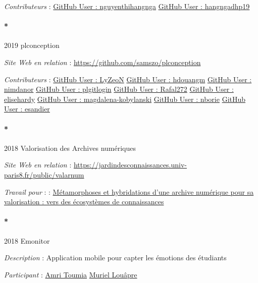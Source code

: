 \documentclass[
  a4paper,
  DIV=11,
  numbers=noendperiod]{scrreprt}
\let\oldparagraph\paragraph
\renewcommand{\paragraph}[1]{\oldparagraph{#1}\mbox{}}
\begin{document}
\emph{Contributeurs} :
\href{http://localhost/samszo/omk/s/fiches/item/301177}{GitHub User :
nguyenthihangnga}
\href{http://localhost/samszo/omk/s/fiches/item/301179}{GitHub User :
hangngadhp19}

\paragraph*{2019 plconception}\label{plconception}

\emph{Site Web en relation} :
\url{https://github.com/samszo/plconception}

\emph{Contributeurs} :
\href{http://localhost/samszo/omk/s/fiches/item/301465}{GitHub User :
LyZeoN} \href{http://localhost/samszo/omk/s/fiches/item/301467}{GitHub
User : hdouangm}
\href{http://localhost/samszo/omk/s/fiches/item/301469}{GitHub User :
nimdanor} \href{http://localhost/samszo/omk/s/fiches/item/301471}{GitHub
User : plgitlogin}
\href{http://localhost/samszo/omk/s/fiches/item/301473}{GitHub User :
Rafal272} \href{http://localhost/samszo/omk/s/fiches/item/301475}{GitHub
User : elisehardy}
\href{http://localhost/samszo/omk/s/fiches/item/301477}{GitHub User :
magdalena-kobylanski}
\href{http://localhost/samszo/omk/s/fiches/item/301479}{GitHub User :
nborie} \href{http://localhost/samszo/omk/s/fiches/item/301481}{GitHub
User : esandier}

\paragraph*{2018 Valorisation des Archives
numériques}\label{sec-item299723}

\emph{Site Web en relation} :
\url{https://jardindesconnaissances.univ-paris8.fr/public/valarnum}

\emph{Travail pour} : :
\href{http://localhost/samszo/omk/s/fiches/item/70159}{Métamorphoses et
hybridations d'une archive numérique pour sa valorisation : vers des
écosystèmes de connaissances}

\paragraph*{2018 Emonitor}\label{sec-item299724}

\emph{Description} : Application mobile pour capter les émotions des
étudiants

\emph{Participant} :
\href{http://localhost/samszo/omk/s/fiches/item/62512}{Amri Toumia}
\href{http://localhost/samszo/omk/s/fiches/item/61960}{Muriel Louâpre}
\end{document}
